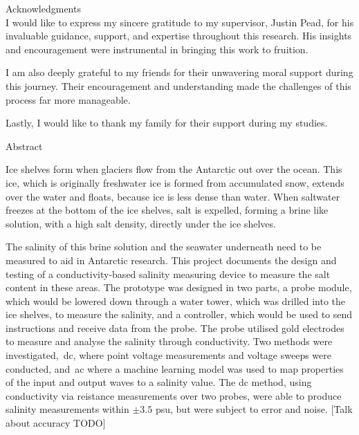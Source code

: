 \documentclass[a4paper,12pt]{report}
\begin{document}
{{%


\newpage
{\Huge Acknowledgments}\\
\vskip 10mm
I would like to express my sincere gratitude to my supervisor, Justin Pead, for his invaluable guidance, support, and expertise throughout this research.
His insights and encouragement were instrumental in bringing this work to fruition.

I am also deeply grateful to my friends for their unwavering moral support during this journey.
Their encouragement and understanding made the challenges of this process far more manageable.

Lastly, I would like to thank my family for their support during my studies.

\newpage
    {\Huge Abstract}\\
    \vskip 10mm

    Ice shelves form when glaciers flow from the Antarctic out over the ocean.
    This ice, which is originally freshwater ice is formed from accumulated snow, extends over the water and floats, because ice is less dense than water.
    When saltwater freezes at the bottom of the ice shelves, salt is expelled, forming a brine like solution, with a high salt density, directly under the ice shelves.

    The salinity of this brine solution and the seawater underneath need to be measured to aid in Antarctic research.
    This project documents the design and testing of a conductivity-based salinity measuring device to measure the salt content in these areas.
    The prototype was designed in two parts, a probe module, which would be lowered down through a water tower, which was drilled into the ice shelves, to measure the salinity, and a controller, which would be used to send instructions and receive data from the probe.
    The probe utilised gold electrodes to measure and analyse the salinity through conductivity.
    Two methods were investigated,~\gls{dc}, where point voltage measurements and voltage sweeps were conducted, and~\gls{ac} where a machine learning model was used to map properties of the input and output waves to a salinity value.
    The \gls{dc} method, using conductivity via reistance measurements over two probes, were able to produce salinity measurements within $\pm3.5$ \gls{psu}, but were subject to error and noise.
    [Talk about accuracy TODO]

}}
\end{document}
